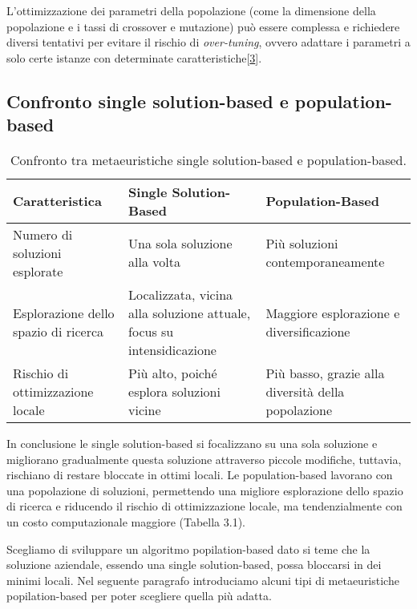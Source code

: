 L'ottimizzazione dei parametri della popolazione (come la dimensione della popolazione e i tassi di crossover e mutazione) può essere complessa e richiedere diversi tentativi per evitare il rischio di \emph{over-tuning}\glsfirstoccur, ovvero adattare i parametri a solo certe istanze con determinate caratteristiche[\hyperlink{bibliografia}{3}].

\subsection{Confronto single solution-based e population-based}

\begin{table}[!ht]
    \centering
    \renewcommand{\arraystretch}{1.7}
    \begin{tabular}{|>{\raggedright\arraybackslash}p{4cm}|>{\raggedright\arraybackslash}p{4cm}|>{\raggedright\arraybackslash}p{4cm}|}
    \hline
    \textbf{Caratteristica} & \textbf{Single Solution-Based} & \textbf{Population-Based} \\ \hline
    Numero di soluzioni esplorate & Una sola soluzione alla volta & Più soluzioni contemporaneamente \\ \hline
    Esplorazione dello spazio di ricerca & Localizzata, vicina alla soluzione attuale, focus su intensidicazione & Maggiore esplorazione e diversificazione \\ \hline
    Rischio di ottimizzazione locale & Più alto, poiché esplora soluzioni vicine & Più basso, grazie alla diversità della popolazione \\ \hline
    \end{tabular}
    \caption{Confronto tra metaeuristiche single solution-based e population-based.}
    \label{tab:comparison}
\end{table}

In conclusione le single solution-based si focalizzano su una sola soluzione e migliorano gradualmente questa soluzione attraverso piccole modifiche, tuttavia, rischiano di restare bloccate in ottimi locali. Le population-based lavorano con una popolazione di soluzioni, permettendo una migliore esplorazione dello spazio di ricerca e riducendo il rischio di ottimizzazione locale, ma tendenzialmente con un costo computazionale maggiore (Tabella 3.1).

Scegliamo di sviluppare un algoritmo popilation-based dato si teme che la soluzione aziendale, essendo una single solution-based, possa bloccarsi in dei minimi locali. Nel seguente paragrafo introduciamo alcuni tipi di metaeuristiche popilation-based per poter scegliere quella più adatta.

